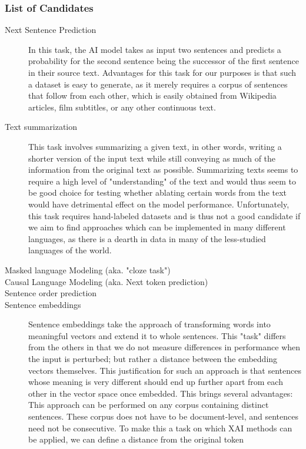 \subsubsection{List of Candidates}
\begin{description}
	\item[Next Sentence Prediction]
	      In this task, the AI model takes as input two sentences and predicts a probability for the second sentence being the successor of the first sentence in their source text.
	      Advantages for this task for our purposes is that such a dataset is easy to generate, as it merely requires a corpus of sentences that follow from each other, which is easily obtained from Wikipedia articles, film subtitles, or any other continuous text.

	\item[Text summarization]
	      This task involves summarizing a given text, in other words, writing a shorter version of the input text while still conveying as much of the information from the original text as possible.
	      Summarizing texts seems to require a high level of "understanding" of the text and would thus seem to be good choice for testing whether ablating certain words from the text would have detrimental effect on the model performance.
	      Unfortunately, this task requires hand-labeled datasets and is thus not a good candidate if we aim to find approaches which can be implemented in many different languages, as there is a dearth in data in many of the less-studied languages of the world.

	\item[Masked language Modeling (aka. "cloze task")]
	\item[Causal Language Modeling (aka. Next token prediction)]
	\item[Sentence order prediction]
	\item[Sentence embeddings]
	      Sentence embeddings take the approach of transforming words into meaningful vectors and extend it to whole sentences.
	      This "task" differs from the others in that we do not measure differences in performance when the input is perturbed; but rather a distance between the embedding vectors themselves.
	      This justification for such an approach is that sentences whose meaning is very different should end up further apart from each other in the vector space once embedded.
	      This brings several advantages:
	      This approach can be performed on any corpus containing distinct sentences.
	      These corpus does not have to be document-level, and sentences need not be consecutive.
	      To make this a task on which XAI methods can be applied, we can define a distance from the original token
\end{description}


